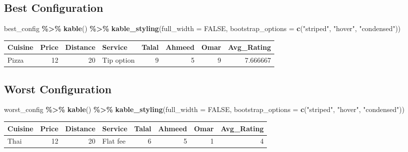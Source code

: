 \documentclass[
]{article}
\newenvironment{Shaded}{\begin{snugshade}}{\end{snugshade}}
\newcommand{\AttributeTok}[1]{\textcolor[rgb]{0.13,0.29,0.53}{#1}}
\newcommand{\ConstantTok}[1]{\textcolor[rgb]{0.56,0.35,0.01}{#1}}
\newcommand{\FunctionTok}[1]{\textcolor[rgb]{0.13,0.29,0.53}{\textbf{#1}}}
\newcommand{\NormalTok}[1]{#1}
\newcommand{\SpecialCharTok}[1]{\textcolor[rgb]{0.81,0.36,0.00}{\textbf{#1}}}
\newcommand{\StringTok}[1]{\textcolor[rgb]{0.31,0.60,0.02}{#1}}
\begin{document}
\subsection{Best Configuration}\label{best-configuration}

\begin{Shaded}
\begin{Highlighting}[]
\NormalTok{best\_config }\SpecialCharTok{\%\textgreater{}\%} 
  \FunctionTok{kable}\NormalTok{() }\SpecialCharTok{\%\textgreater{}\%} 
  \FunctionTok{kable\_styling}\NormalTok{(}\AttributeTok{full\_width =} \ConstantTok{FALSE}\NormalTok{, }\AttributeTok{bootstrap\_options =} \FunctionTok{c}\NormalTok{(}\StringTok{"striped"}\NormalTok{, }\StringTok{"hover"}\NormalTok{, }\StringTok{"condensed"}\NormalTok{))}
\end{Highlighting}
\end{Shaded}

\begin{longtable}[t]{lrrlrrrr}
\toprule
Cuisine & Price & Distance & Service & Talal & Ahmeed & Omar & Avg\_Rating\\
\midrule
Pizza & 12 & 20 & Tip option & 9 & 5 & 9 & 7.666667\\
\bottomrule
\end{longtable}

\subsection{Worst Configuration}\label{worst-configuration}

\begin{Shaded}
\begin{Highlighting}[]
\NormalTok{worst\_config }\SpecialCharTok{\%\textgreater{}\%} 
  \FunctionTok{kable}\NormalTok{() }\SpecialCharTok{\%\textgreater{}\%} 
  \FunctionTok{kable\_styling}\NormalTok{(}\AttributeTok{full\_width =} \ConstantTok{FALSE}\NormalTok{, }\AttributeTok{bootstrap\_options =} \FunctionTok{c}\NormalTok{(}\StringTok{"striped"}\NormalTok{, }\StringTok{"hover"}\NormalTok{, }\StringTok{"condensed"}\NormalTok{))}
\end{Highlighting}
\end{Shaded}

\begin{longtable}[t]{lrrlrrrr}
\toprule
Cuisine & Price & Distance & Service & Talal & Ahmeed & Omar & Avg\_Rating\\
\midrule
Thai & 12 & 20 & Flat fee & 6 & 5 & 1 & 4\\
\bottomrule
\end{longtable}
\end{document}
